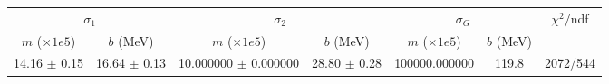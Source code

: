 \begin{tabular}{cc|cc|cc||c}
\multicolumn{2}{c|}{$\sigma_1$} & \multicolumn{2}{|c}{$\sigma_2$} & \multicolumn{2}{|c}{$\sigma_G$}  & \multirow{2}{*}{$\chi^2/$ndf}\\
$m$ ($\times1e5$) & $b$ (MeV) & $m$ ($\times1e5$) & $b$ (MeV) & $m$ ($\times1e5$) & $b$ (MeV) & \\
\hline
14.16 $\pm$ 0.15 & 16.64 $\pm$ 0.13 & 10.000000 $\pm$ 0.000000 & 28.80 $\pm$ 0.28 & 100000.000000 & 119.8 & 2072/544\\
\end{tabular}
